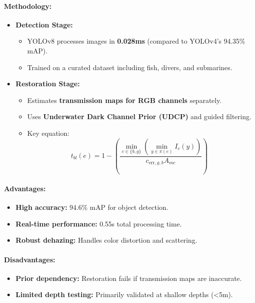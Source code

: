 \documentclass{article}
\begin{document}
\paragraph{Methodology:}
\begin{itemize}
    \item \textbf{Detection Stage:}
          \begin{itemize}
              \item YOLOv8 processes images in \textbf{0.028ms} (compared to YOLOv4’s 94.35\% mAP).
              \item Trained on a curated dataset including fish, divers, and submarines.
          \end{itemize}

    \item \textbf{Restoration Stage:}
          \begin{itemize}
              \item Estimates \textbf{transmission maps for RGB channels} separately.
              \item Uses \textbf{Underwater Dark Channel Prior (UDCP)} and guided filtering.
              \item Key equation:
                    \[
                        t_{bl}(e) = 1 - \left( \frac{\min_{c \in \{b,g\}}(\min_{y \in \pi(e)} I_c(y))}{c_{\text{err},g,b} A_{mc}} \right)
                    \]
          \end{itemize}
\end{itemize}

\paragraph{Advantages:}
\begin{itemize}
    \item \textbf{High accuracy:} 94.6\% mAP for object detection.
    \item \textbf{Real-time performance:} 0.55s total processing time.
    \item \textbf{Robust dehazing:} Handles color distortion and scattering.
\end{itemize}

\paragraph{Disadvantages:}
\begin{itemize}
    \item \textbf{Prior dependency:} Restoration fails if transmission maps are inaccurate.
    \item \textbf{Limited depth testing:} Primarily validated at shallow depths (\textless5m).
\end{itemize}
\end{document}
